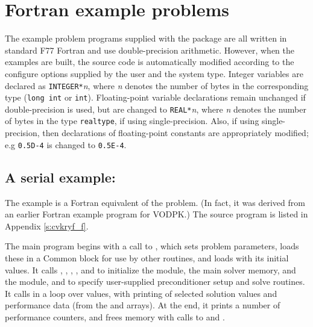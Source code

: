 \section{Fortran example problems}\label{s:ex_fortran}

The {\F} example problem programs supplied with the {\cvode}
package are all written in standard F77 Fortran and use double-precision
arithmetic. However, when the {\F} examples are built, the source code is
automatically modified according to the configure options supplied by the
user and the system type. Integer variables are declared as {\tt INTEGER*}{\em n},
where {\em n} denotes the number of bytes in the corresponding {\C} type
({\tt long int} or {\tt int}). Floating-point variable declarations remain
unchanged if double-precision is used, but are changed to {\tt REAL*}{\em n},
where {\em n} denotes the number of bytes in the {\sundials} type {\tt realtype},
if using single-precision. Also, if using single-precision, then declarations of
floating-point constants are appropriately modified; e.g {\tt 0.5D-4} is
changed to {\tt 0.5E-4}.


\subsection{A serial example: }\label{ss:cvkryf}

The  example is a Fortran equivalent of the  problem.
(In fact, it was derived from an earlier Fortran example program for VODPK.)
The source program  is listed in Appendix \ref{s:cvkryf_f}.

The main program begins with a call to , which sets problem
parameters, loads these in a Common block for use by other routines, and
loads  with its initial values.  It calls , ,
, , and  to initialize
the {\nvecs} module, the main solver memory, and the {\cvspgmr} module, and
to specify user-supplied preconditioner setup and solve routines.
It calls  in a loop over  values, with printing of
selected solution values and performance data (from the   and 
arrays).  At the end, it prints a number of performance counters, and
frees memory with calls to  and .

